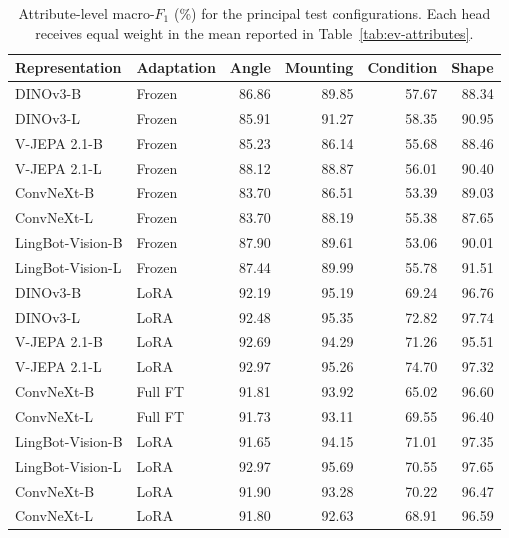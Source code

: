 \begin{table}[htbp]
\centering
\small
\caption{Attribute-level macro-$F_1$ (\%) for the principal test configurations. Each head receives equal weight in the mean reported in Table~\ref{tab:ev-attributes}.}
\label{tab:ev-attribute-heads}
\renewcommand{\arraystretch}{1.15}
\begin{tabularx}{\textwidth}{@{}>{\raggedright\arraybackslash}Xlrrrr@{}}
\toprule
Representation & Adaptation & Angle & Mounting & Condition & Shape \\
\midrule
DINOv3-B & Frozen & 86.86 & 89.85 & 57.67 & 88.34 \\
DINOv3-L & Frozen & 85.91 & 91.27 & 58.35 & 90.95 \\
V-JEPA 2.1-B & Frozen & 85.23 & 86.14 & 55.68 & 88.46 \\
V-JEPA 2.1-L & Frozen & 88.12 & 88.87 & 56.01 & 90.40 \\
ConvNeXt-B & Frozen & 83.70 & 86.51 & 53.39 & 89.03 \\
ConvNeXt-L & Frozen & 83.70 & 88.19 & 55.38 & 87.65 \\
LingBot-Vision-B & Frozen & 87.90 & 89.61 & 53.06 & 90.01 \\
LingBot-Vision-L & Frozen & 87.44 & 89.99 & 55.78 & 91.51 \\
DINOv3-B & LoRA & 92.19 & 95.19 & 69.24 & 96.76 \\
DINOv3-L & LoRA & 92.48 & 95.35 & 72.82 & 97.74 \\
V-JEPA 2.1-B & LoRA & 92.69 & 94.29 & 71.26 & 95.51 \\
V-JEPA 2.1-L & LoRA & 92.97 & 95.26 & 74.70 & 97.32 \\
ConvNeXt-B & Full FT & 91.81 & 93.92 & 65.02 & 96.60 \\
ConvNeXt-L & Full FT & 91.73 & 93.11 & 69.55 & 96.40 \\
LingBot-Vision-B & LoRA & 91.65 & 94.15 & 71.01 & 97.35 \\
LingBot-Vision-L & LoRA & 92.97 & 95.69 & 70.55 & 97.65 \\
ConvNeXt-B & LoRA & 91.90 & 93.28 & 70.22 & 96.47 \\
ConvNeXt-L & LoRA & 91.80 & 92.63 & 68.91 & 96.59 \\
\bottomrule
\end{tabularx}
\end{table}


